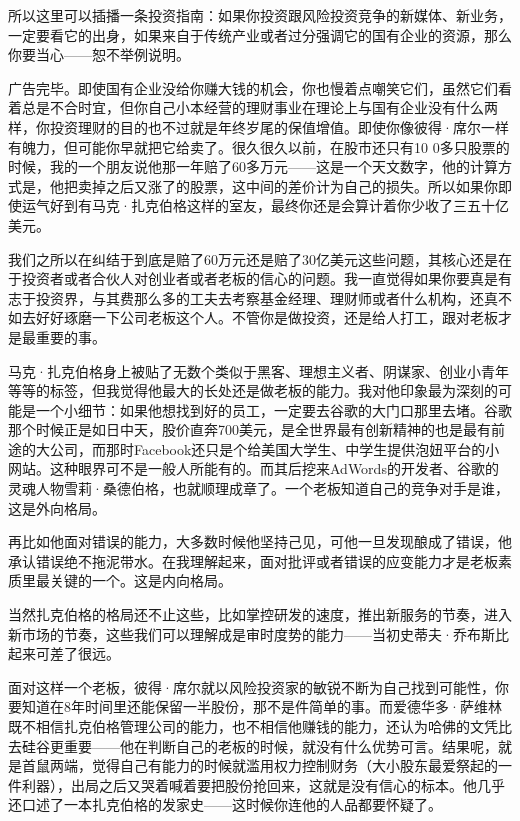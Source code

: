 所以这里可以插播一条投资指南：如果你投资跟风险投资竞争的新媒体、新业务，一定要看它的出身，如果来自于传统产业或者过分强调它的国有企业的资源，那么你要当心------恕不举例说明。

广告完毕。即使国有企业没给你赚大钱的机会，你也慢着点嘲笑它们，虽然它们看着总是不合时宜，但你自己小本经营的理财事业在理论上与国有企业没有什么两样，你投资理财的目的也不过就是年终岁尾的保值增值。即使你像彼得·席尔一样有魄力，但可能你早就把它给卖了。很久很久以前，在股市还只有10
0多只股票的时候，我的一个朋友说他那一年赔了60多万元------这是一个天文数字，他的计算方式是，他把卖掉之后又涨了的股票，这中间的差价计为自己的损失。所以如果你即使运气好到有马克·扎克伯格这样的室友，最终你还是会算计着你少收了三五十亿美元。

我们之所以在纠结于到底是赔了60万元还是赔了30亿美元这些问题，其核心还是在于投资者或者合伙人对创业者或者老板的信心的问题。我一直觉得如果你要真是有志于投资界，与其费那么多的工夫去考察基金经理、理财师或者什么机构，还真不如去好好琢磨一下公司老板这个人。不管你是做投资，还是给人打工，跟对老板才是最重要的事。

马克·扎克伯格身上被贴了无数个类似于黑客、理想主义者、阴谋家、创业小青年等等的标签，但我觉得他最大的长处还是做老板的能力。我对他印象最为深刻的可能是一个小细节：如果他想找到好的员工，一定要去谷歌的大门口那里去堵。谷歌那个时候正是如日中天，股价直奔700美元，是全世界最有创新精神的也是最有前途的大公司，而那时Facebook还只是个给美国大学生、中学生提供泡妞平台的小网站。这种眼界可不是一般人所能有的。而其后挖来AdWords的开发者、谷歌的灵魂人物雪莉·桑德伯格，也就顺理成章了。一个老板知道自己的竞争对手是谁，这是外向格局。

再比如他面对错误的能力，大多数时候他坚持己见，可他一旦发现酿成了错误，他承认错误绝不拖泥带水。在我理解起来，面对批评或者错误的应变能力才是老板素质里最关键的一个。这是内向格局。

当然扎克伯格的格局还不止这些，比如掌控研发的速度，推出新服务的节奏，进入新市场的节奏，这些我们可以理解成是审时度势的能力------当初史蒂夫·乔布斯比起来可差了很远。

面对这样一个老板，彼得·席尔就以风险投资家的敏锐不断为自己找到可能性，你要知道在8年时间里还能保留一半股份，那不是件简单的事。而爱德华多·萨维林既不相信扎克伯格管理公司的能力，也不相信他赚钱的能力，还认为哈佛的文凭比去硅谷更重要------他在判断自己的老板的时候，就没有什么优势可言。结果呢，就是首鼠两端，觉得自己有能力的时候就滥用权力控制财务（大小股东最爱祭起的一件利器），出局之后又哭着喊着要把股份抢回来，这就是没有信心的标本。他几乎还口述了一本扎克伯格的发家史------这时候你连他的人品都要怀疑了。


